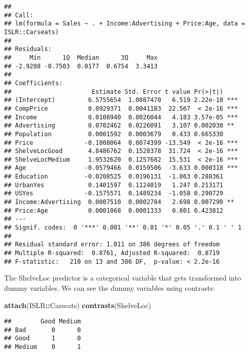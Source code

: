 \documentclass[]{article}
\newenvironment{Shaded}{\begin{snugshade}}{\end{snugshade}}
\newcommand{\KeywordTok}[1]{\textcolor[rgb]{0.13,0.29,0.53}{\textbf{#1}}}
\newcommand{\OperatorTok}[1]{\textcolor[rgb]{0.81,0.36,0.00}{\textbf{#1}}}
\newcommand{\NormalTok}[1]{#1}
\begin{document}
\begin{verbatim}
## 
## Call:
## lm(formula = Sales ~ . + Income:Advertising + Price:Age, data = ISLR::Carseats)
## 
## Residuals:
##     Min      1Q  Median      3Q     Max 
## -2.9208 -0.7503  0.0177  0.6754  3.3413 
## 
## Coefficients:
##                      Estimate Std. Error t value Pr(>|t|)    
## (Intercept)         6.5755654  1.0087470   6.519 2.22e-10 ***
## CompPrice           0.0929371  0.0041183  22.567  < 2e-16 ***
## Income              0.0108940  0.0026044   4.183 3.57e-05 ***
## Advertising         0.0702462  0.0226091   3.107 0.002030 ** 
## Population          0.0001592  0.0003679   0.433 0.665330    
## Price              -0.1008064  0.0074399 -13.549  < 2e-16 ***
## ShelveLocGood       4.8486762  0.1528378  31.724  < 2e-16 ***
## ShelveLocMedium     1.9532620  0.1257682  15.531  < 2e-16 ***
## Age                -0.0579466  0.0159506  -3.633 0.000318 ***
## Education          -0.0208525  0.0196131  -1.063 0.288361    
## UrbanYes            0.1401597  0.1124019   1.247 0.213171    
## USYes              -0.1575571  0.1489234  -1.058 0.290729    
## Income:Advertising  0.0007510  0.0002784   2.698 0.007290 ** 
## Price:Age           0.0001068  0.0001333   0.801 0.423812    
## ---
## Signif. codes:  0 '***' 0.001 '**' 0.01 '*' 0.05 '.' 0.1 ' ' 1
## 
## Residual standard error: 1.011 on 386 degrees of freedom
## Multiple R-squared:  0.8761, Adjusted R-squared:  0.8719 
## F-statistic:   210 on 13 and 386 DF,  p-value: < 2.2e-16
\end{verbatim}

The ShelveLoc predictor is a categorical variable that gets transformed
into dummy variables. We can see the dummy variables using contrasts:

\begin{Shaded}
\begin{Highlighting}[]
\KeywordTok{attach}\NormalTok{(ISLR}\OperatorTok{::}\NormalTok{Carseats)}
\KeywordTok{contrasts}\NormalTok{(ShelveLoc)}
\end{Highlighting}
\end{Shaded}

\begin{verbatim}
##        Good Medium
## Bad       0      0
## Good      1      0
## Medium    0      1
\end{verbatim}
\end{document}
